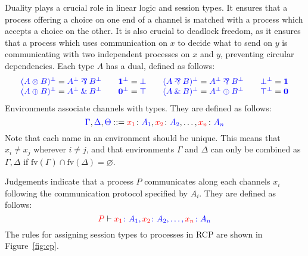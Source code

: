 \documentclass[a4paper,UKenglish]{lipics-v2016}
\begin{document}
Duality plays a crucial role in linear logic and session types. It ensures that
a process offering a choice on one end of a channel is matched with a process
which accepts a choice on the other. It is also crucial to deadlock freedom, as
it ensures that a process which uses communication on $x$ to decide what to send
on $y$ is communicating with two independent processes on $x$ and $y$,
preventing circular dependencies. Each type $A$ has a dual, defined as follows:
\[
  \begin{array}{ccccccc}
    \tm{( A \tens B )^\bot} = \tm{A^\bot \parr B^\bot}&&
    \tm{\one^\bot}          = \tm{\bot}&&
    \tm{( A \parr B )^\bot} = \tm{A^\bot \parr B^\bot}&&
    \tm{\bot^\bot}          = \tm{\one}\\
    \tm{( A \plus B )^\bot} = \tm{A^\bot \with B^\bot}&&
    \tm{\nil^\bot}          = \tm{\top}&&
    \tm{( A \with B )^\bot} = \tm{A^\bot \plus B^\bot}&&
    \tm{\top^\bot}          = \tm{\nil}
  \end{array}
\]
Environments associate channels with types. They are defined as follows:
\[
  \blue{\Gamma},\blue{\Delta},\blue{\Theta} ::=
  \tm[x_1]{A_1},\tm[x_2]{A_2},\dots,\tm[x_n]{A_n}
\]
Note that each name in an environment should be unique. This means that $x_i
\neq x_j$ wherever $i \neq j$, and that environments $\Gamma$ and $\Delta$ can
only be combined as $\Gamma, \Delta$ if $\text{fv}(\Gamma) \cap
\text{fv}(\Delta) = \varnothing$. 

Judgements indicate that a process $P$ communicates along each channels $x_i$
following the communication protocol specified by $A_i$. They are defined as
follows:
\[
  \seq[{ P }]{ \tm[x_1]{A_1},\tm[x_2]{A_2},\dots,\tm[x_n]{A_n} }
\]
The rules for assigning session types to processes in RCP are shown in
Figure~\ref{fig:cp}.
%

\end{document}
